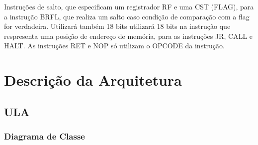 \documentclass{report}
\begin{document}
\begin{itemize}
  Instruções de salto, que especificam um registrador RF e uma CST (FLAG), para a instrução BRFL, que realiza um salto caso condição de comparação com a flag for verdadeira. Utilizará também 18 bits  utilizará 18 bits na instrução que respresenta uma posição de endereço de memória, para as instruções JR, CALL e HALT. As instruções RET e NOP só utilizam o OPCODE da instrução.\\
  
  \end{itemize}

\chapter{Descrição da Arquitetura}

  \section{ULA}

    \subsection{Diagrama de Classe}
    \begin{figure}[H]
	\centering
      \end{figure}      
     
\end{document}
